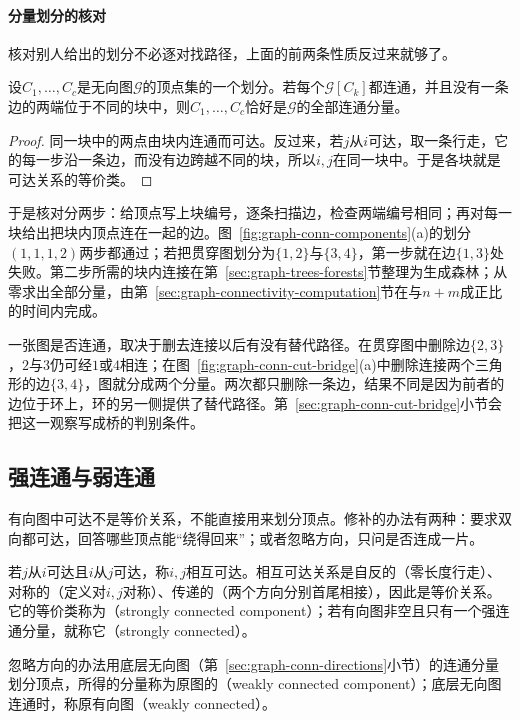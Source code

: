 \paragraph{分量划分的核对}
核对别人给出的划分不必逐对找路径，上面的前两条性质反过来就够了。

\begin{lemma}[分量划分的核对]
\label{lem:graph-conn-component-check}
设$C_1,\ldots,C_c$是无向图$\mathcal G$的顶点集的一个划分。若每个$\mathcal G[C_k]$都连通，并且没有一条边的两端位于不同的块中，则$C_1,\ldots,C_c$恰好是$\mathcal G$的全部连通分量。
\end{lemma}

\begin{proof}
同一块中的两点由块内连通而可达。反过来，若$j$从$i$可达，取一条行走，它的每一步沿一条边，而没有边跨越不同的块，所以$i,j$在同一块中。于是各块就是可达关系的等价类。
\end{proof}

于是核对分两步：给顶点写上块编号，逐条扫描边，检查两端编号相同；再对每一块给出把块内顶点连在一起的边。图~\ref{fig:graph-conn-components}(a)的划分$(1,1,1,2)$两步都通过；若把贯穿图划分为$\{1,2\}$与$\{3,4\}$，第一步就在边$\{1,3\}$处失败。第二步所需的块内连接在第~\ref{sec:graph-trees-forests}节整理为生成森林；从零求出全部分量，由第~\ref{sec:graph-connectivity-computation}节在与$n+m$成正比的时间内完成。

一张图是否连通，取决于删去连接以后有没有替代路径。在贯穿图中删除边$\{2,3\}$，$2$与$3$仍可经$1$或$4$相连；在图~\ref{fig:graph-conn-cut-bridge}(a)中删除连接两个三角形的边$\{3,4\}$，图就分成两个分量。两次都只删除一条边，结果不同是因为前者的边位于环上，环的另一侧提供了替代路径。第~\ref{sec:graph-conn-cut-bridge}小节会把这一观察写成桥的判别条件。

\subsection{强连通与弱连通}
\label{sec:graph-conn-strong-weak}

有向图中可达不是等价关系，不能直接用来划分顶点。修补的办法有两种：要求双向都可达，回答哪些顶点能“绕得回来”；或者忽略方向，只问是否连成一片。

若$j$从$i$可达且$i$从$j$可达，称$i,j$相互可达。相互可达关系是自反的（零长度行走）、对称的（定义对$i,j$对称）、传递的（两个方向分别首尾相接），因此是等价关系。它的等价类称为（strongly connected component）；若有向图非空且只有一个强连通分量，就称它（strongly connected）。

忽略方向的办法用底层无向图（第~\ref{sec:graph-conn-directions}小节）的连通分量划分顶点，所得的分量称为原图的（weakly connected component）；底层无向图连通时，称原有向图（weakly connected）。

